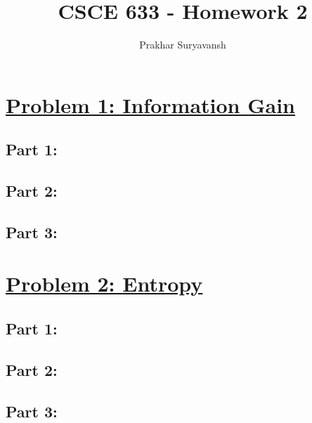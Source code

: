 \documentclass[12pt]{article}
\title{CSCE 633 - Homework 2}
\author{Prakhar Suryavansh}
\date{}
\begin{document}
\maketitle

\section*{\underline{Problem 1:  Information Gain}}

\subsection*{Part 1:}

\subsection*{Part 2:}

\subsection*{Part 3:}


\section*{\underline{Problem 2: Entropy}}

\subsection*{Part 1:}

\subsection*{Part 2:}

\subsection*{Part 3:}
\end{document}
